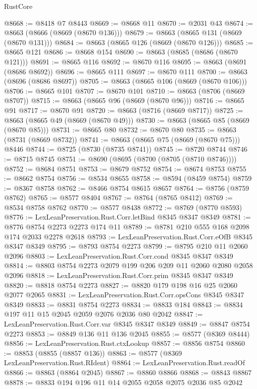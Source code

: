 \begin{lexlean}{RustCore}
\begin{coremodule}
@8668 := @8418 @7 @8443
@8669 := @8668 @11
@8670 := @2031 @43
@8674 := @8663 (@8666 (@8669 (@8670 @136)))
@8679 := @8663 (@8665 @131 (@8669 (@8670 @131)))
@8684 := @8663 (@8665 @126 (@8669 (@8670 @126)))
@8685 := @8665 @121
@8686 := @8668 @154
@8690 := @8663 (@8685 (@8686 (@8670 @121)))
@8691 := @8665 @116
@8692 := @8670 @116
@8695 := @8663 (@8691 (@8686 @8692))
@8696 := @8665 @111
@8697 := @8670 @111
@8700 := @8663 (@8696 (@8686 @8697))
@8705 := @8663 (@8665 @106 (@8669 (@8670 @106)))
@8706 := @8665 @101
@8707 := @8670 @101
@8710 := @8663 (@8706 (@8669 @8707))
@8715 := @8663 (@8665 @96 (@8669 (@8670 @96)))
@8716 := @8665 @91
@8717 := @8670 @91
@8720 := @8663 (@8716 (@8669 @8717))
@8725 := @8663 (@8665 @49 (@8669 (@8670 @49)))
@8730 := @8663 (@8665 @85 (@8669 (@8670 @85)))
@8731 := @8665 @80
@8732 := @8670 @80
@8735 := @8663 (@8731 (@8669 @8732))
@8741 := @8663 (@8665 @75 (@8669 (@8670 @75))) @8446
@8744 := @8725 (@8730 (@8735 @8741))
@8745 := @8720 @8744
@8746 := @8715 @8745
@8751 := @8690 (@8695 (@8700 (@8705 (@8710 @8746))))
@8752 := @8684 @8751
@8753 := @8679 @8752
@8754 := @8674 @8753
@8755 := @8662 @8754
@8756 := @8534 @8655
@8758 := @8594 (@8459 @8754)
@8759 := @8367 @8758
@8762 := @8466 @8754 @8615 @8657
@8764 := @8756 (@8759 @8762)
@8765 := @8577 @8404
@8767 := @8764 (@8765 @8412)
@8769 := @8534 @8758 @8762
@8770 := @8577 @8438
@8772 := @8769 (@8770 @8593)
@8776 := LexLeanPreservation.Rust.Corr.letBind @8345 @8347 @8349
@8781 := @8776 @8754 @2273 @2273 @174 @11
@8789 := @8781 @210 @555 @168 @2098 @174 @2033 @2278 @2618
@8793 := LexLeanPreservation.Rust.Corr.eOfB @8345 @8347 @8349
@8795 := @8793 @8754 @2273
@8799 := @8795 @210 @11 @2060 @2096
@8803 := LexLeanPreservation.Rust.Corr.cond @8345 @8347 @8349
@8814 := @8803 @8754 @2273 @2079 @199 @206 @209 @11 @2060 @2080 @2058 @2096
@8818 := LexLeanPreservation.Rust.Corr.prim @8345 @8347 @8349
@8820 := @8818 @8754 @2273
@8827 := @8820 @179 @198 @16 @25 @2060 @2077 @2065
@8831 := LexLeanPreservation.Rust.Corr.opsCons @8345 @8347 @8349
@8833 := @8831 @8754 @2273
@8834 := @8833 @184
@8843 := @8834 @197 @11 @15 @2045 @2059 @2076 @2036 @80 @2042
@8847 := LexLeanPreservation.Rust.Corr.var @8345 @8347 @8349
@8849 := @8847 @8754 @2273
@8853 := @8849 @136 @11 @136 @2045
@8855 := @8577 (@8369 @8444)
@8856 := LexLeanPreservation.Rust.ctxLookup
@8857 := @8856 @8754
@8860 := @8853 (@8855 (@8857 @136))
@8863 := @8577 (@8369 LexLeanPreservation.Rust.RIdent)
@8864 := LexLeanPreservation.Rust.readOf
@8866 := @8863 (@8864 @2045)
@8867 := @8860 @8866
@8868 := @8843 @8867
@8878 := @8833 @194 @196 @11 @14 @2055 @2058 @2075 @2036 @85 @2042

\end{coremodule}
\end{lexlean}
